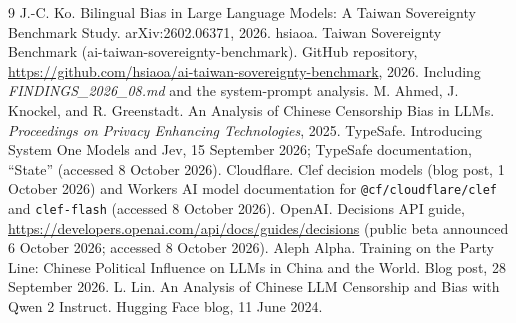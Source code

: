 \documentclass[11pt]{article}
\begin{document}
\begin{thebibliography}{9}
 J.-C. Ko. Bilingual Bias in Large Language Models: A Taiwan Sovereignty Benchmark Study. arXiv:2602.06371, 2026.
 hsiaoa. Taiwan Sovereignty Benchmark (ai-taiwan-sovereignty-benchmark). GitHub repository, \url{https://github.com/hsiaoa/ai-taiwan-sovereignty-benchmark}, 2026. Including \emph{FINDINGS\_2026\_08.md} and the system-prompt analysis.
 M. Ahmed, J. Knockel, and R. Greenstadt. An Analysis of Chinese Censorship Bias in LLMs. \emph{Proceedings on Privacy Enhancing Technologies}, 2025.
 TypeSafe. Introducing System One Models and Jev, 15 September 2026; TypeSafe documentation, ``State'' (accessed 8 October 2026).
 Cloudflare. Clef decision models (blog post, 1 October 2026) and Workers AI model documentation for \texttt{@cf/cloudflare/clef} and \texttt{clef-flash} (accessed 8 October 2026).
 OpenAI. Decisions API guide, \url{https://developers.openai.com/api/docs/guides/decisions} (public beta announced 6 October 2026; accessed 8 October 2026).
 Aleph Alpha. Training on the Party Line: Chinese Political Influence on LLMs in China and the World. Blog post, 28 September 2026.
 L. Lin. An Analysis of Chinese LLM Censorship and Bias with Qwen 2 Instruct. Hugging Face blog, 11 June 2024.
\end{thebibliography}
\end{document}
